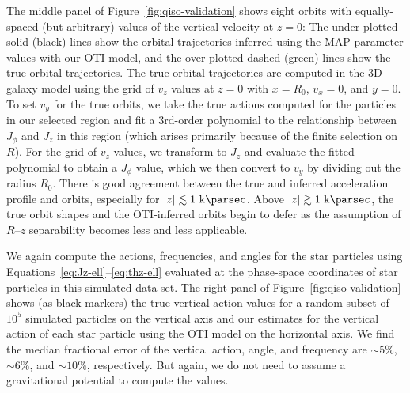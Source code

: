 \documentclass[modern]{aastex631}
\begin{document}
The middle panel of Figure~\ref{fig:qiso-validation} shows eight orbits with
equally-spaced (but arbitrary) values of the vertical velocity at $z=0$: The
under-plotted solid (black) lines show the orbital trajectories inferred using the MAP
parameter values with our OTI model, and the over-plotted dashed (green) lines show the
true orbital trajectories.
The true orbital trajectories are computed in the 3D galaxy model using the grid of
$v_z$ values at $z=0$ with $x=R_0$, $v_x=0$, and $y=0$.
To set $v_y$ for the true orbits, we take the true actions computed for the particles in
our selected region and fit a 3rd-order polynomial to the relationship between $J_\phi$
and $J_z$ in this region (which arises primarily because of the finite selection on
$R$).
For the grid of $v_z$ values, we transform to $J_z$ and evaluate the fitted polynomial
to obtain a $J_\phi$ value, which we then convert to $v_y$ by dividing out the radius
$R_0$.
There is good agreement between the true and inferred acceleration profile and orbits,
especially for $|z| \lesssim 1~\kpc$.
Above $|z| \gtrsim 1~\kpc$, the true orbit shapes and the OTI-inferred orbits begin to
defer as the assumption of $R$--$z$ separability becomes less and less applicable.

We again compute the actions, frequencies, and angles for the star particles using
Equations~\ref{eq:Jz-ell}--\ref{eq:thz-ell} evaluated at the phase-space coordinates of
star particles in this simulated data set.
The right panel of Figure~\ref{fig:qiso-validation} shows (as black markers) the true
vertical action values for a random subset of $10^5$ simulated particles on the vertical
axis and our estimates for the vertical action of each star particle using the OTI
model on the horizontal axis.
We find the median fractional error of the vertical action, angle, and frequency are
$\sim 5\%$, $\sim 6\%$, and $\sim 10\%$, respectively.
But again, we do not need to assume a gravitational potential to compute the values.
\end{document}
